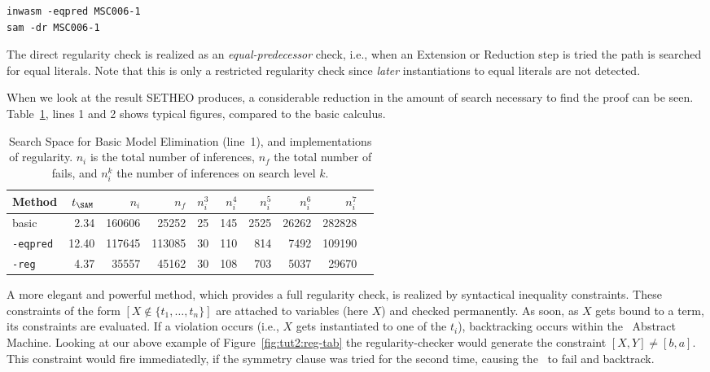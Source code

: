 \begin{center}
\begin{verbatim}
inwasm -eqpred MSC006-1
sam -dr MSC006-1
\end{verbatim}
\end{center}

The direct regularity check is realized as an {\em
equal-predecessor\/} check, i.e., when an Extension or Reduction step
is tried the path is searched for equal literals. Note that this is
only a restricted regularity check since {\em later\/} instantiations
to equal literals are not detected. 

When we look at the result SETHEO produces, a considerable 
reduction in the amount of search necessary to find the proof
can be seen.
Table~\ref{tab:tut2:results.regularity}, lines 1 and 2
shows typical figures, compared
to the basic calculus.

\begin{table}[htb]
\begin{center}
\begin{tabular}{|l|r|r|r||r|r|r|r|r|r|}
\hline
Method & $t_{\SAM}$ & $n_i$ & $n_f$ & 
	$n_i^3$ & $n_i^4$ & $n_i^5$ & $n_i^6$ & $n_i^7$ \\
\hline\hline
basic & 2.34 & 160606 & 25252 &
	25 & 145 & 2525 & 26262 & 282828 \\
\hline
{\tt -eqpred} & 12.40 & 117645 & 113085 &
	30 & 110 & 814 & 7492 & 109190 \\
\hline
{\tt -reg} & 4.37 & 35557 & 45162 &
	30 & 108 & 703 & 5037 & 29670 \\
\hline\hline
\end{tabular}
\end{center}
\caption{Search Space for Basic Model Elimination (line~1), 
and implementations of regularity. $n_i$ is the total number of inferences,
$n_f$ the total number of fails, and $n^k_i$ the number of inferences
on search level $k$.}
\label{tab:tut2:results.regularity}
\end{table}


A more elegant and powerful method, which provides a full
regularity check, is realized by syntactical
inequality constraints. These constraints of the form
$ [ X \not\in \{t_1,\ldots,t_n\}] $  are attached to variables (here $X$)
and checked permanently. As soon, as $X$ gets bound to a term,
its constraints are evaluated. If a violation occurs (i.e.,
$X$ gets instantiated to one of the $t_i$), backtracking
occurs within the \SAM\ Abstract Machine.
Looking at our above example of Figure~\ref{fig:tut2:reg-tab}
the regularity-checker would
generate the constraint $[ X,Y ] \not = [ b,a ]$. This constraint
would fire immediatedly, if the symmetry clause was tried for the
second time, causing the \SAM\ to fail and backtrack.

